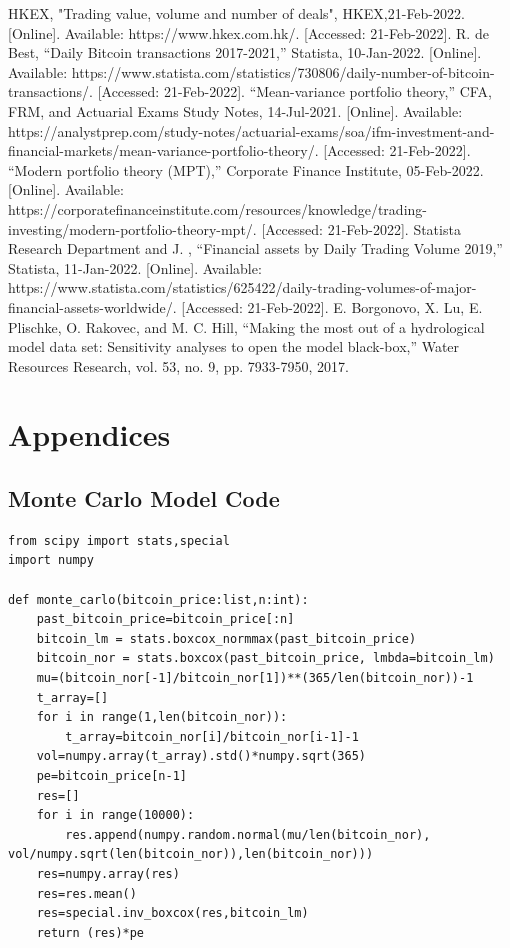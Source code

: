 \documentclass[12pt]{article}
\begin{document}
\begin{thebibliography}{99}  
    HKEX, "Trading value, volume and number of deals", HKEX,21-Feb-2022. [Online]. Available: https://www.hkex.com.hk/. [Accessed: 21-Feb-2022]. 
    R. de Best, “Daily Bitcoin transactions 2017-2021,” Statista, 10-Jan-2022. [Online]. Available: https://www.statista.com/statistics/730806/daily-number-of-bitcoin-transactions/. [Accessed: 21-Feb-2022].   
    “Mean-variance portfolio theory,” CFA, FRM, and Actuarial Exams Study Notes, 14-Jul-2021. [Online]. Available: https://analystprep.com/study-notes/actuarial-exams/soa/ifm-investment-and-financial-markets/mean-variance-portfolio-theory/. [Accessed: 21-Feb-2022]. 
    “Modern portfolio theory (MPT),” Corporate Finance Institute, 05-Feb-2022. [Online]. Available: https://corporatefinanceinstitute.com/resources/knowledge/trading-investing/modern-portfolio-theory-mpt/. [Accessed: 21-Feb-2022].  
    Statista Research Department and J. , “Financial assets by Daily Trading Volume 2019,” Statista, 11-Jan-2022. [Online]. Available: https://www.statista.com/statistics/625422/daily-trading-volumes-of-major-financial-assets-worldwide/. [Accessed: 21-Feb-2022]. 
    E. Borgonovo, X. Lu, E. Plischke, O. Rakovec, and M. C. Hill, “Making the most out of a hydrological model data set: Sensitivity analyses to open the model black-box,” Water Resources Research, vol. 53, no. 9, pp. 7933-7950, 2017. 
\end{thebibliography}
\newpage
\section{Appendices}
\subsection{Monte Carlo Model Code}
\begin{lstlisting}
from scipy import stats,special
import numpy

def monte_carlo(bitcoin_price:list,n:int):
    past_bitcoin_price=bitcoin_price[:n]
    bitcoin_lm = stats.boxcox_normmax(past_bitcoin_price)
    bitcoin_nor = stats.boxcox(past_bitcoin_price, lmbda=bitcoin_lm)
    mu=(bitcoin_nor[-1]/bitcoin_nor[1])**(365/len(bitcoin_nor))-1
    t_array=[]
    for i in range(1,len(bitcoin_nor)):
        t_array=bitcoin_nor[i]/bitcoin_nor[i-1]-1
    vol=numpy.array(t_array).std()*numpy.sqrt(365)
    pe=bitcoin_price[n-1]
    res=[]
    for i in range(10000):
        res.append(numpy.random.normal(mu/len(bitcoin_nor), vol/numpy.sqrt(len(bitcoin_nor)),len(bitcoin_nor)))
    res=numpy.array(res)
    res=res.mean()
    res=special.inv_boxcox(res,bitcoin_lm)
    return (res)*pe   
\end{lstlisting}
\end{document}
